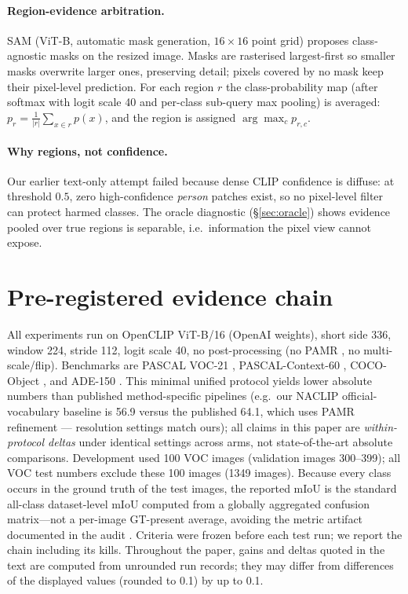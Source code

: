 \documentclass[11pt]{article}
\newcommand{\miou}{mIoU}
\begin{document}
\paragraph{Region-evidence arbitration.} SAM (ViT-B, automatic mask generation,
$16\times16$ point grid) proposes class-agnostic masks on the resized image. Masks are
rasterised largest-first so smaller masks overwrite larger ones, preserving detail;
pixels covered by no mask keep their pixel-level prediction. For each region $r$ the
class-probability map (after softmax with logit scale 40 and per-class sub-query max
pooling) is averaged: $p_r = \frac{1}{|r|}\sum_{x\in r} p(x)$, and the region is
assigned $\arg\max_c p_{r,c}$.

\paragraph{Why regions, not confidence.} Our earlier text-only attempt failed because
dense CLIP confidence is diffuse: at threshold $0.5$, zero high-confidence
\emph{person} patches exist, so no pixel-level filter can protect harmed classes. The
oracle diagnostic (\S\ref{sec:oracle}) shows evidence pooled over true regions is
separable, i.e.\ information the pixel view cannot expose.

\section{Pre-registered evidence chain}
\label{sec:prereg}

All experiments run on OpenCLIP \citep{ilharco2021openclip} ViT-B/16 (OpenAI
weights), short side 336, window 224, stride 112, logit scale 40, no
post-processing (no PAMR \citep{araslanov2020}, no multi-scale/flip). Benchmarks
are PASCAL VOC-21 \citep{everingham2010voc}, PASCAL-Context-60
\citep{mottaghi2014context}, COCO-Object \citep{lin2014coco}, and ADE-150
\citep{zhou2017ade}. This
minimal unified protocol yields lower absolute numbers than published method-specific
pipelines (e.g.\ our NACLIP official-vocabulary baseline is 56.9 versus the published
64.1, which uses PAMR refinement --- resolution settings match ours); all claims in this paper are
\emph{within-protocol deltas} under identical settings across arms, not
state-of-the-art absolute comparisons. Development used 100 VOC images (validation
images 300--399); all VOC test numbers exclude these 100 images (1349 images).
Because every class occurs in the ground truth of the test images, the reported
\miou{} is the standard all-class dataset-level \miou{} computed from a globally
aggregated confusion matrix---not a per-image GT-present average, avoiding the metric
artifact documented in the audit \citep{sam2026fragile}. Criteria were frozen before
each test run; we report the chain including its kills. Throughout the paper,
gains and deltas quoted in the text are computed from unrounded run records;
they may differ from differences of the displayed values (rounded to 0.1) by
up to 0.1.
\end{document}
